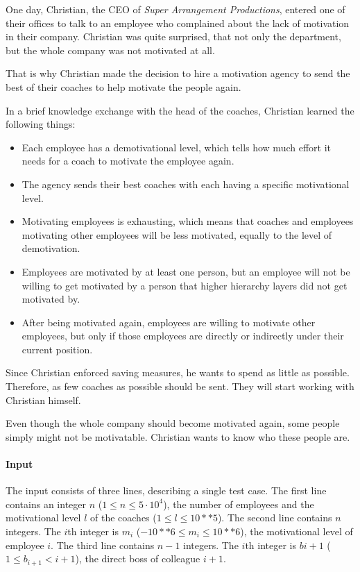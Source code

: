 



\makeheader

One day, Christian, the CEO of \textit{Super Arrangement Productions}, entered one of their offices
to talk to an employee who complained about the lack of motivation in their company. 
Christian was quite surprised, that not only the department, but the whole company was not motivated
at all.

That is why Christian made the decision to hire a motivation agency to send the best of their coaches
to help motivate the people again.

In a brief knowledge exchange with the head of the coaches, Christian learned the following things:

\begin{itemize}
    \item Each employee has a demotivational level, which tells how much effort it needs for a coach to motivate the employee again.
    \item The agency sends their best coaches with each having a specific motivational level.
    \item Motivating employees is exhausting, which means that coaches and employees motivating other employees will be less motivated, equally to the level of demotivation.
    \item Employees are motivated by at least one person, but an employee will not be willing to get motivated by a person that higher hierarchy layers did not get motivated by.
    \item After being motivated again, employees are willing to motivate other employees, but only if those employees are directly or indirectly under their current position.
\end{itemize}

Since Christian enforced saving measures, he wants to spend as little as possible. Therefore, as few coaches
as possible should be sent. They will start working with Christian himself.

Even though the whole company should become motivated again, some people simply might not be motivatable.
Christian wants to know who these people are.

\paragraph*{Input}

The input consists of three lines, describing a single test case.
The first line contains an integer $n$ ($1 \leq n \leq 5 \cdot 10^4$), the number of employees and the motivational level $l$ of the coaches ($1 \leq l \leq 10**5$).
The second line contains $n$ integers. The $i$th integer is $m_i$ ($-10**6 \leq m_i \leq 10**6$), the motivational level of employee $i$.
The third line contains $n - 1$ integers. The $i$th integer is $bi+1$ ($1 \leq b_{i+1} < i + 1$), the direct boss of colleague $i + 1$.

